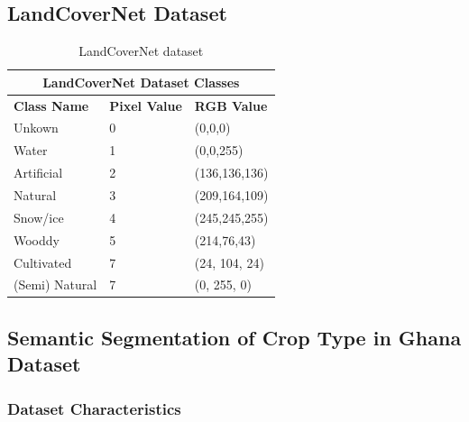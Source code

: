 \documentclass[sigconf, nonacm]{acmart}
\begin{document}
\subsection{LandCoverNet Dataset}
\begin{table}[htbp]
\centering
\caption{LandCoverNet dataset}
\begin{tabular}{|p{1.8cm}|p{0.6cm}|p{1.6cm}|}
 \hline
 \multicolumn{3}{|c|}{\textbf{LandCoverNet Dataset Classes}} \\
 \hline
 \textbf{Class Name} & \textbf{Pixel Value}& \textbf{RGB Value} \\
 \hline
 Unkown & 0  & (0,0,0)\\ 
 \hline
 Water & 1  & (0,0,255)\\ 
 \hline
 Artificial & 2  & (136,136,136)\\ 
 \hline
 Natural & 3  & (209,164,109)\\ 
 \hline
 Snow/ice & 4 &  (245,245,255)\\ 
 \hline
 Wooddy & 5  & (214,76,43)\\ 
 \hline
 Cultivated & 7  & (24, 104, 24)\\ 
 \hline
 (Semi) Natural & 7  & (0, 255, 0)\\ 
 \hline
\end{tabular}
\label{landcovernet_dataset}
\end{table}

\subsection{Semantic Segmentation of Crop Type in Ghana Dataset}
\subsubsection{Dataset Characteristics}
\end{document}
